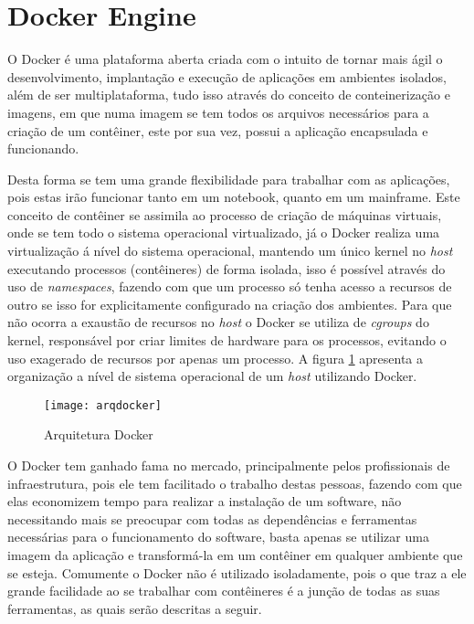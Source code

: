 \section{Docker Engine}
\label{sec:docker}
O Docker é uma plataforma aberta criada com o intuito de tornar mais ágil o desenvolvimento, implantação e execução de aplicações em ambientes isolados, além de ser multiplataforma, tudo isso através do conceito de conteinerização e imagens, em que numa imagem se tem todos os arquivos necessários para a criação de um contêiner, este por sua vez, possui a aplicação encapsulada  e funcionando.

Desta forma se tem uma grande flexibilidade para trabalhar com as aplicações, pois estas irão funcionar tanto em um notebook, quanto em um mainframe. Este conceito de contêiner se assimila ao processo de criação de máquinas virtuais, onde se tem todo o sistema operacional virtualizado, já o Docker realiza uma virtualização á nível do sistema operacional, mantendo um único kernel no \textit{host} executando processos (contêineres) de forma isolada, isso é possível através do uso de \textit{namespaces}, fazendo com que um processo só tenha acesso a recursos de outro se isso for explicitamente configurado na criação dos ambientes. Para que não ocorra a exaustão de recursos no \textit{host} o Docker se utiliza de \textit{cgroups} do kernel, responsável por criar limites de hardware para os processos, evitando o uso exagerado de recursos por apenas um processo. A figura \ref{fig:arqdocker} apresenta a organização a nível de sistema operacional de um \textit{host} utilizando Docker.~\cite{docker}

\begin{figure}[!h]
\caption{\label{fig:arqdocker} Arquitetura Docker}
\begin{center}
\texttt{[image: arqdocker]}
\end{center}
\end{figure}

O Docker tem ganhado fama no mercado, principalmente pelos profissionais de infraestrutura, pois ele tem facilitado o trabalho destas pessoas, fazendo com que elas economizem tempo para realizar a instalação de um software, não necessitando mais se preocupar com todas as dependências e ferramentas necessárias para o funcionamento do software, basta apenas se utilizar uma imagem da aplicação e transformá-la em um contêiner em qualquer ambiente que se esteja. Comumente o Docker não é utilizado isoladamente, pois o que traz a ele grande facilidade ao se trabalhar com contêineres é a junção de todas as suas ferramentas, as quais serão descritas a seguir.~\cite{docker}

